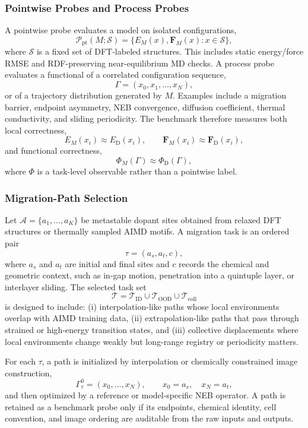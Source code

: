 \subsubsection{Pointwise Probes and Process Probes}
\label{sec:point_path_process}

A pointwise probe evaluates a model on isolated configurations,
\[
    \mathcal P_{\mathrm{pt}}(M;\mathcal S)
    =
    \{E_M(x),\mathbf F_M(x):x\in\mathcal S\},
\]
where $\mathcal S$ is a fixed set of DFT-labeled structures. This includes static energy/force RMSE and RDF-preserving near-equilibrium MD checks. A process probe evaluates a functional of a correlated configuration sequence,
\[
    \Gamma = (x_0,x_1,\ldots,x_N),
\]
or of a trajectory distribution generated by $M$. Examples include a migration barrier, endpoint asymmetry, NEB convergence, diffusion coefficient, thermal conductivity, and sliding periodicity. The benchmark therefore measures both local correctness,
\[
    E_M(x_i)\approx E_{\mathrm D}(x_i), \qquad
    \mathbf F_M(x_i)\approx\mathbf F_{\mathrm D}(x_i),
\]
and functional correctness,
\[
    \Phi_M(\Gamma)\approx \Phi_{\mathrm D}(\Gamma),
\]
where $\Phi$ is a task-level observable rather than a pointwise label.

\subsubsection{Migration-Path Selection}
\label{sec:path_selection_formal}

Let $\mathcal A=\{a_1,\ldots,a_K\}$ be metastable dopant sites obtained from relaxed DFT structures or thermally sampled AIMD motifs. A migration task is an ordered pair
\[
    \tau=(a_s,a_t,c),
\]
where $a_s$ and $a_t$ are initial and final sites and $c$ records the chemical and geometric context, such as in-gap motion, penetration into a quintuple layer, or interlayer sliding. The selected task set
\[
    \mathcal T=\mathcal T_{\mathrm{ID}}\cup\mathcal T_{\mathrm{OOD}}\cup\mathcal T_{\mathrm{coll}}
\]
is designed to include: (i) interpolation-like paths whose local environments overlap with AIMD training data, (ii) extrapolation-like paths that pass through strained or high-energy transition states, and (iii) collective displacements where local environments change weakly but long-range registry or periodicity matters.

For each $\tau$, a path is initialized by interpolation or chemically constrained image construction,
\[
    \Gamma^0_\tau=(x_0,\ldots,x_N),\qquad x_0=a_s,\quad x_N=a_t,
\]
and then optimized by a reference or model-specific NEB operator. A path is retained as a benchmark probe only if its endpoints, chemical identity, cell convention, and image ordering are auditable from the raw inputs and outputs.

